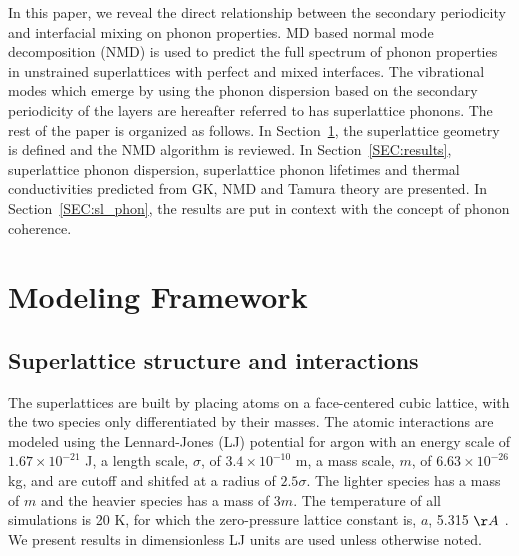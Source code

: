 In this paper, we reveal the direct relationship between the secondary periodicity and interfacial mixing on phonon properties. MD based normal mode decomposition (NMD) is used to predict the full spectrum of phonon properties in unstrained superlattices with perfect and mixed interfaces. The vibrational modes which emerge by using the phonon dispersion based on the secondary periodicity of the layers are hereafter referred to has superlattice phonons. The rest of the paper is organized as follows. In Section~\ref{SEC:modeling}, the superlattice geometry is defined and the NMD algorithm is reviewed. In Section~\ref{SEC:results}, superlattice phonon dispersion, superlattice phonon lifetimes and thermal conductivities predicted from GK, NMD and Tamura theory are presented. In Section~\ref{SEC:sl_phon}, the results are put in context with the concept of phonon coherence.


\section{Modeling Framework}\label{SEC:modeling}
\subsection{Superlattice structure and interactions}\label{SEC:sl_struc}
The superlattices are built by placing atoms on a face-centered cubic lattice, with the two species only differentiated by their masses. The atomic interactions are modeled using the Lennard-Jones (LJ) potential for argon with an energy scale of $1.67\times10^{-21}$ J, a length scale, $\sigma$, of $3.4\times10^{-10}$ m, a mass scale, $m$, of $6.63\times10^{-26}$ kg, and are cutoff and shitfed at a radius of $2.5\sigma$. The lighter species has a mass of $m$ and the heavier species has a mass of $3m$. The temperature of all simulations is 20 K, for which the zero-pressure lattice constant is, $a$, 5.315 $\AA$ \cite{mcgaugheythesis}. We present results in  dimensionless LJ units are used unless otherwise noted. 


